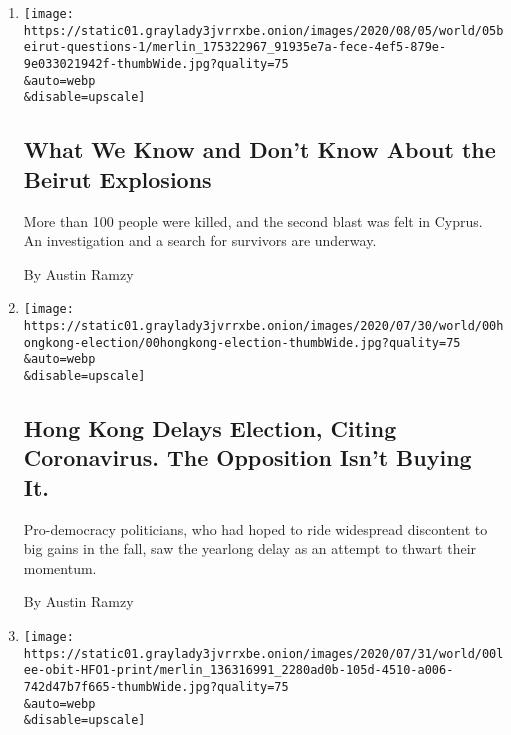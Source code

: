 \begin{enumerate}
\def\labelenumi{\arabic{enumi}.}
\item
  \href{/2020/08/05/world/middleeast/beirut-explosion-what-happened.html}{}

  \texttt{[image: https://static01.graylady3jvrrxbe.onion/images/2020/08/05/world/05beirut-questions-1/merlin\_175322967\_91935e7a-fece-4ef5-879e-9e033021942f-thumbWide.jpg?quality=75\\\&auto=webp\\\&disable=upscale]}

  \hypertarget{what-we-know-and-dont-know-about-the-beirut-explosions}{%
  \subsection{What We Know and Don't Know About the Beirut
  Explosions}\label{what-we-know-and-dont-know-about-the-beirut-explosions}}

  More than 100 people were killed, and the second blast was felt in
  Cyprus. An investigation and a search for survivors are underway.

  By Austin Ramzy
\item
  \href{/2020/07/31/world/asia/hong-kong-election-delayed.html}{}

  \texttt{[image: https://static01.graylady3jvrrxbe.onion/images/2020/07/30/world/00hongkong-election/00hongkong-election-thumbWide.jpg?quality=75\\\&auto=webp\\\&disable=upscale]}

  \hypertarget{hong-kong-delays-election-citing-coronavirus-the-opposition-isnt-buying-it}{%
  \subsection{Hong Kong Delays Election, Citing Coronavirus. The
  Opposition Isn't Buying
  It.}\label{hong-kong-delays-election-citing-coronavirus-the-opposition-isnt-buying-it}}

  Pro-democracy politicians, who had hoped to ride widespread discontent
  to big gains in the fall, saw the yearlong delay as an attempt to
  thwart their momentum.

  By Austin Ramzy
\item
  \href{/2020/07/30/world/asia/lee-teng-hui-dead.html}{}

  \texttt{[image: https://static01.graylady3jvrrxbe.onion/images/2020/07/31/world/00lee-obit-HFO1-print/merlin\_136316991\_2280ad0b-105d-4510-a006-742d47b7f665-thumbWide.jpg?quality=75\\\&auto=webp\\\&disable=upscale]}

  \hypertarget{lee-teng-hui-97-who-led-taiwans-turn-to-democracy-dies}{%
}
\end{enumerate}
